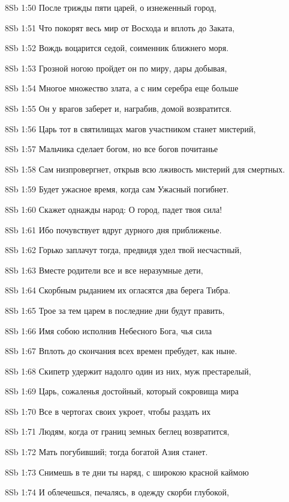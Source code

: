 \vs 8Sb 1:50 После трижды пяти царей, о изнеженный город, 

\vs 8Sb 1:51 Что покорят весь мир от Восхода и вплоть до Заката, 

\vs 8Sb 1:52 Вождь воцарится седой, соименник ближнего моря. 

\vs 8Sb 1:53 Грозной ногою пройдет он по миру, дары добывая, 

\vs 8Sb 1:54 Многое множество злата, а с ним серебра еще больше

\vs 8Sb 1:55 Он у врагов заберет и, награбив, домой возвратится. 

\vs 8Sb 1:56 Царь тот в святилищах магов участником станет мистерий, 

\vs 8Sb 1:57 Мальчика сделает богом, но все богов почитанье 

\vs 8Sb 1:58 Сам низпровергнет, открыв всю лживость мистерий для смертных. 

\vs 8Sb 1:59 Будет ужасное время, когда сам Ужасный погибнет.

\vs 8Sb 1:60 Скажет однажды народ: О город, падет твоя сила!  

\vs 8Sb 1:61 Ибо почувствует вдруг дурного дня приближенье. 

\vs 8Sb 1:62 Горько заплачут тогда, предвидя удел твой несчастный, 

\vs 8Sb 1:63 Вместе родители все и все неразумные дети, 

\vs 8Sb 1:64 Скорбным рыданием их огласятся два берега Тибра.

\vs 8Sb 1:65 Трое за тем царем в последние дни будут править, 

\vs 8Sb 1:66 Имя собою исполнив Небесного Бога, чья сила 

\vs 8Sb 1:67 Вплоть до скончания всех времен пребудет, как ныне. 

\vs 8Sb 1:68 Скипетр удержит надолго один из них, муж престарелый, 

\vs 8Sb 1:69 Царь, сожаленья достойный, который сокровища мира

\vs 8Sb 1:70 Все в чертогах своих укроет, чтобы раздать их

\vs 8Sb 1:71 Людям, когда от границ земных беглец возвратится, 

\vs 8Sb 1:72 Мать погубивший; тогда богатой Азия станет. 

\vs 8Sb 1:73 Снимешь в те дни ты наряд, с широкою красной каймою 

\vs 8Sb 1:74 И облечешься, печалясь, в одежду скорби глубокой,

